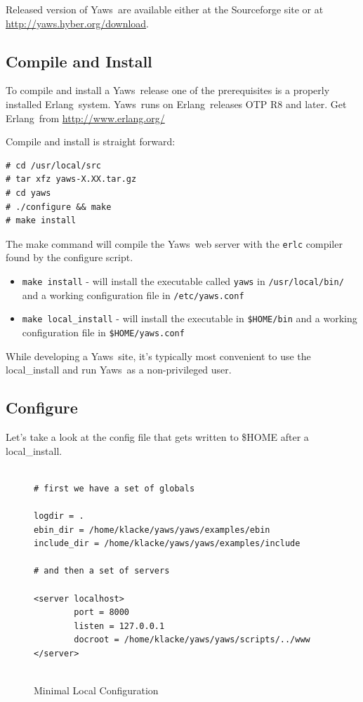 \documentclass[11pt,oneside,english]{book}
\newcommand{\Erlang}            %
        {{\sc Erlang}}
\newcommand{\Yaws}            %
        {{\sc Yaws}}
\begin{document}
Released version of \Yaws\  are available either at the Sourceforge site or
at \url{http://yaws.hyber.org/download}.



\subsection{Compile and Install}

To compile and install a \Yaws\  release
one of the prerequisites is a properly installed \Erlang\  system. \Yaws\
runs on \Erlang\  releases OTP R8 and later. Get \Erlang\  from
\url{http://www.erlang.org/}

Compile and install is straight forward:
\begin{verbatim}
# cd /usr/local/src
# tar xfz yaws-X.XX.tar.gz
# cd yaws
# ./configure && make
# make install
\end{verbatim}

The make command will compile the \Yaws\  web server with the \verb+erlc+
compiler found by the configure script.

\begin{itemize}

\item  \verb+make install+ - will install the executable called
         \verb+yaws+ in \verb+/usr/local/bin/+ and a working
         configuration file in \verb+/etc/yaws.conf+

\item  \verb+make local_install+ - will install the executable in
         \verb+$HOME/bin+ and a working configuration file in
         \verb+$HOME/yaws.conf+

\end{itemize}

While developing a \Yaws\  site, it's typically most convenient to
use the local\_install and run \Yaws\  as a non-privileged user.


\subsection{Configure}
Let's take a look at the config file that gets written to \$HOME after
a local\_install.


\begin{figure}[h]
\begin{verbatim}

# first we have a set of globals

logdir = .
ebin_dir = /home/klacke/yaws/yaws/examples/ebin
include_dir = /home/klacke/yaws/yaws/examples/include

# and then a set of servers

<server localhost>
        port = 8000
        listen = 127.0.0.1
        docroot = /home/klacke/yaws/yaws/scripts/../www
</server>


\end{verbatim}
\caption{Minimal Local Configuration}
\end{figure}
\end{document}
